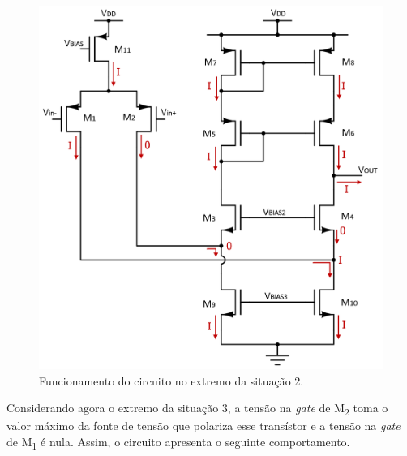 \documentclass[11pt]{article}
\numberwithin{equation}{section}
\begin{document}
\begin{figure}[H]
	\centering
	\includegraphics[keepaspectratio=true, scale=0.50]{teoricas/situacao2}
	\vspace{-0.5em}
	\caption{Funcionamento do circuito no extremo da situação 2.}
	\vspace{-0.8em}
\end{figure} 

Considerando agora o extremo da situação 3, a tensão na \textit{gate} de M\textsubscript{2} toma o valor máximo da fonte de tensão que polariza esse transístor e a tensão na \textit{gate} de M\textsubscript{1} é nula. Assim, o circuito apresenta o seguinte comportamento.
\end{document}
